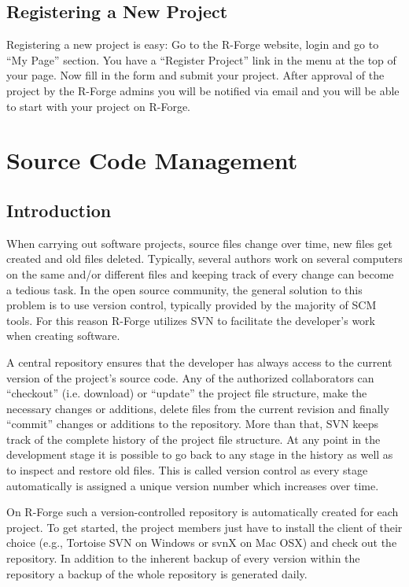 \documentclass[a4paper]{article}
\newcommand{\proglang}[1]{\textsf{#1}}
\begin{document}
\subsection{Registering a New Project}
\label{sec:newproject}

Registering a new project is easy: Go to the \proglang{R}-Forge website, login and
go to ``My Page'' section. You have a ``Register Project'' link in the
menu at the top of your page. Now fill in the form and submit your
project. After approval of the project by the \proglang{R}-Forge admins  you will
be notified via email and you will be able to start with your project
on \proglang{R}-Forge.

\section{Source Code Management}
\label{sec:scm}

\subsection{Introduction}

When carrying out software projects, source files change over time,
new files get created and old files deleted. Typically, several authors
work on several computers on the same and/or different files and keeping
track of every change can become a tedious task. In the open source
community, the general solution to this problem is to use version
control, typically provided by the majority of SCM tools. For this
reason \proglang{R}-Forge utilizes SVN to facilitate the developer's
work when creating software.

A central repository ensures that the developer
has always access to the current version of the project's source
code. Any of the authorized collaborators can ``checkout''
(i.e. download) or ``update'' the project
file structure, make the necessary changes or additions, delete
files from the current revision and finally ``commit'' changes or
additions to the repository. More than
that, SVN keeps track of the complete history of the project file
structure. At any point in the development stage it is possible to go
back to any stage in the history as well as to inspect and restore old
files. This is called version control as every stage automatically is
assigned a unique version number which increases over time. 

On \proglang{R}-Forge such a version-controlled repository is automatically
created for each project. To get started, the project members just
have to install the client of their choice (e.g., Tortoise SVN on
Windows or svnX on 
Mac OSX) and check out the repository. In addition to the inherent
backup of every version within the repository a backup of the whole
repository is generated daily. 
\end{document}
